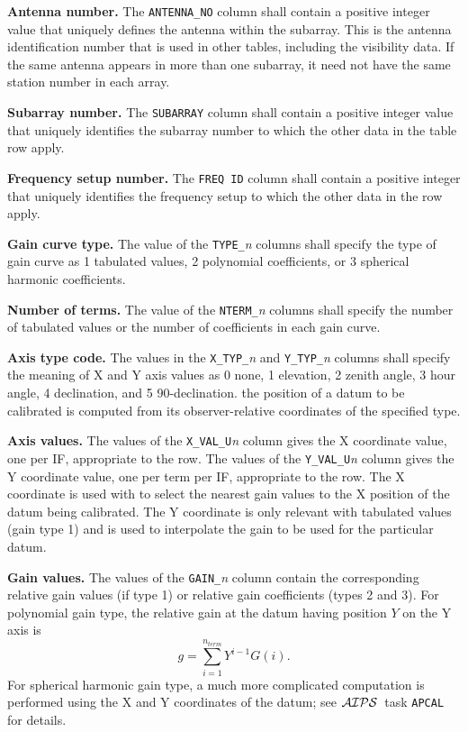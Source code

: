 \documentclass[twoside]{article}
\newcommand{\AIPS}{{$\cal AIPS\/$}}
\begin{document}
{\bf Antenna number.} The {\tt ANTENNA\_NO} column shall contain a
positive integer value that uniquely defines the antenna within the
subarray.  This is the antenna identification number that is used in
other tables, including the visibility data. If the same antenna
appears in more than one subarray, it need not have the same station
number in each array.

{\bf Subarray number.} The {\tt SUBARRAY} column shall contain a
positive integer value that uniquely identifies the subarray number
to which the other data in the table row apply.

{\bf Frequency setup number.} The {\tt FREQ ID} column shall contain a
positive integer that uniquely identifies the frequency setup to which
the other data in the row apply.

{\bf Gain curve type.}  The value of the {\tt TYPE\_}{\it n} columns
shall specify the type of gain curve as 1 tabulated values, 2
polynomial coefficients, or 3 spherical harmonic coefficients.

{\bf Number of terms.}  The value of the {\tt NTERM\_}{\it n} columns
shall specify the number of tabulated values or the number of
coefficients in each gain curve.

{\bf Axis type code.}  The values in the {\tt X\_TYP\_}{\it n} and
{\tt Y\_TYP\_}{\it n} columns shall specify the meaning of X and Y
axis values as 0 none, 1 elevation, 2 zenith angle, 3 hour angle, 4
declination, and 5 90-declination.  the position of a datum to be
calibrated is computed from its observer-relative coordinates of the
specified type.

{\bf Axis values.}  The values of the {\tt X\_VAL\_U}{\it n} column
gives the X coordinate value, one per IF, appropriate to the row.  The
values of the {\tt Y\_VAL\_U}{\it n} column gives the Y coordinate
value, one per term per IF, appropriate to the row.  The X coordinate
is used with to select the nearest gain values to the X position of
the datum being calibrated.  The Y coordinate is only relevant with
tabulated values (gain type 1) and is used to interpolate the gain to
be used for the particular datum.

{\bf Gain values.} The values of the {\tt GAIN\_}{\it n} column
contain the corresponding relative gain values (if type 1) or
relative gain coefficients (types 2 and 3).  For polynomial gain type,
the relative gain at the datum having position $Y$ on the Y axis is
\begin{equation}
    g = \sum_{i=1}^{n_{term}} Y^{i-1} G(i) .
\end{equation}
For spherical harmonic gain type, a much more complicated computation
is performed using the X and Y coordinates of the datum; see \AIPS\
task {\tt APCAL} for details.
\end{document}
